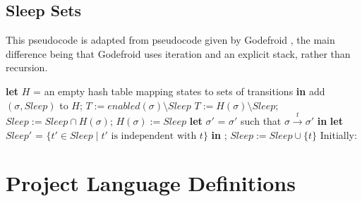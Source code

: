 \documentclass[12pt,a4paper,twoside,openright]{report}
\newcommand{\Let}[2]{\State \textbf{let} #1 = #2 \textbf{in}}
\begin{document}
\section{Sleep Sets}
\label{sapp:sleep-code}

This pseudocode is adapted from pseudocode
given by Godefroid \cite{god96}, the main
difference being that Godefroid uses
iteration and an explicit stack, rather
than recursion.
\smallskip
\begin{algorithmic}[1]
	\Let{$H$}{an empty hash table mapping
		states to sets of transitions}
	\State
	\State add $(\sigma, \textit{Sleep})$ to $H$;
	\State$T := \textit{enabled}(\sigma)
	\setminus \textit{Sleep}$
	\Else
	\State$T := H(\sigma) \setminus
	\textit{Sleep}$;
	\State $\textit{Sleep} := \textit{Sleep}
	\cap H(\sigma)$;
	\State $H(\sigma) := \textit{Sleep}$
	\EndIf
	\Let{$\sigma'$}{$\sigma'$ such that
		$\sigma \xrightarrow{t} \sigma'$}
	\Let{$\textit{Sleep}'$}{$\{t' \in \textit{Sleep}
		\mid t' \text{ is independent with } t\}$}
	\State{};
	\State $\textit{Sleep} := \textit{Sleep} \cup \{t\}$
	\EndFor
	\EndProcedure
	\State
	\State Initially: 
\end{algorithmic}

\chapter{Project Language Definitions}
\end{document}
